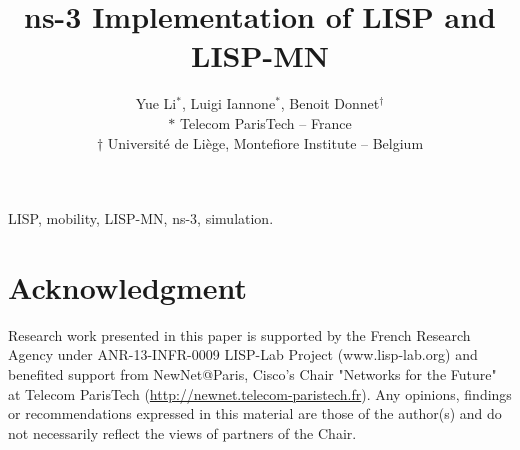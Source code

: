 \documentclass[10pt, conference]{IEEEtran}
\begin{document}
\title{ns-3 Implementation of LISP and LISP-MN }

\author{Yue Li{$^{\ast}$}, Luigi Iannone{$^{\ast}$}, Benoit Donnet{$^{\dag}$}\\
$\ast$ Telecom ParisTech -- France\\
$\dag$ Universit\'e de Li\`ege, Montefiore Institute -- Belgium
}



\maketitle

  

\begin{IEEEkeywords}
	LISP, mobility, LISP-MN, ns-3, simulation.
\end{IEEEkeywords}

\IEEEpeerreviewmaketitle









\section*{Acknowledgment}
Research work presented in this paper is supported by the French Research Agency
under ANR-13-INFR-0009 LISP-Lab Project (www.lisp-lab.org) and benefited support
from NewNet@Paris, Cisco's Chair "{\sc Networks for the Future}" at Telecom
ParisTech (\url{http://newnet.telecom-paristech.fr}). Any opinions, findings or
recommendations expressed in this material are those of the author(s) and do not
necessarily reflect the views of partners of the Chair.     



{%
\balance


}
\end{document}
